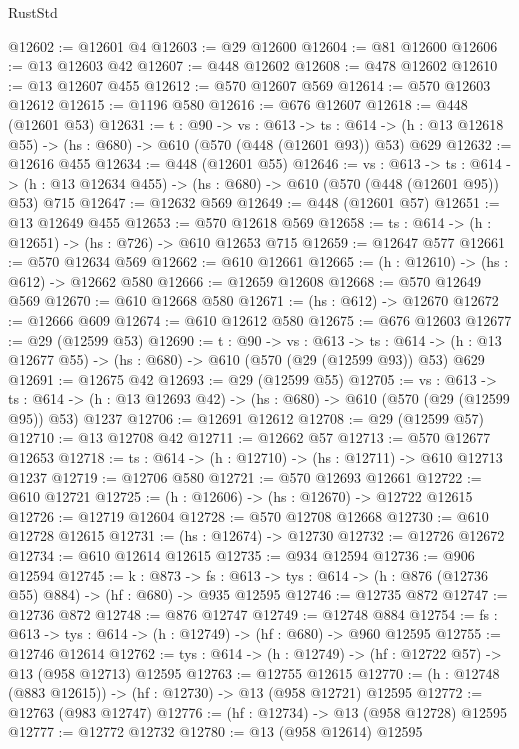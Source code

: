 \begin{lexlean}{RustStd}
\begin{coremodule}
@12602 := @12601 @4
@12603 := @29 @12600
@12604 := @81 @12600
@12606 := @13 @12603 @42
@12607 := @448 @12602
@12608 := @478 @12602
@12610 := @13 @12607 @455
@12612 := @570 @12607 @569
@12614 := @570 @12603 @12612
@12615 := @1196 @580
@12616 := @676 @12607
@12618 := @448 (@12601 @53)
@12631 := {t : @90} ->
  {vs : @613} ->
  {ts : @614} -> (h : @13 @12618 @55) -> (hs : @680) -> @610 (@570 (@448 (@12601 @93)) @53) @629
@12632 := @12616 @455
@12634 := @448 (@12601 @55)
@12646 := {vs : @613} ->
  {ts : @614} -> (h : @13 @12634 @455) -> (hs : @680) -> @610 (@570 (@448 (@12601 @95)) @53) @715
@12647 := @12632 @569
@12649 := @448 (@12601 @57)
@12651 := @13 @12649 @455
@12653 := @570 @12618 @569
@12658 := {ts : @614} -> (h : @12651) -> (hs : @726) -> @610 @12653 @715
@12659 := @12647 @577
@12661 := @570 @12634 @569
@12662 := @610 @12661
@12665 := (h : @12610) -> (hs : @612) -> @12662 @580
@12666 := @12659 @12608
@12668 := @570 @12649 @569
@12670 := @610 @12668 @580
@12671 := (hs : @612) -> @12670
@12672 := @12666 @609
@12674 := @610 @12612 @580
@12675 := @676 @12603
@12677 := @29 (@12599 @53)
@12690 := {t : @90} ->
  {vs : @613} ->
  {ts : @614} -> (h : @13 @12677 @55) -> (hs : @680) -> @610 (@570 (@29 (@12599 @93)) @53) @629
@12691 := @12675 @42
@12693 := @29 (@12599 @55)
@12705 := {vs : @613} ->
  {ts : @614} -> (h : @13 @12693 @42) -> (hs : @680) -> @610 (@570 (@29 (@12599 @95)) @53) @1237
@12706 := @12691 @12612
@12708 := @29 (@12599 @57)
@12710 := @13 @12708 @42
@12711 := @12662 @57
@12713 := @570 @12677 @12653
@12718 := {ts : @614} -> (h : @12710) -> (hs : @12711) -> @610 @12713 @1237
@12719 := @12706 @580
@12721 := @570 @12693 @12661
@12722 := @610 @12721
@12725 := (h : @12606) -> (hs : @12670) -> @12722 @12615
@12726 := @12719 @12604
@12728 := @570 @12708 @12668
@12730 := @610 @12728 @12615
@12731 := (hs : @12674) -> @12730
@12732 := @12726 @12672
@12734 := @610 @12614 @12615
@12735 := @934 @12594
@12736 := @906 @12594
@12745 := {k : @873} ->
  {fs : @613} -> {tys : @614} -> (h : @876 (@12736 @55) @884) -> (hf : @680) -> @935 @12595
@12746 := @12735 @872
@12747 := @12736 @872
@12748 := @876 @12747
@12749 := @12748 @884
@12754 := {fs : @613} -> {tys : @614} -> (h : @12749) -> (hf : @680) -> @960 @12595
@12755 := @12746 @12614
@12762 := {tys : @614} -> (h : @12749) -> (hf : @12722 @57) -> @13 (@958 @12713) @12595
@12763 := @12755 @12615
@12770 := (h : @12748 (@883 @12615)) -> (hf : @12730) -> @13 (@958 @12721) @12595
@12772 := @12763 (@983 @12747)
@12776 := (hf : @12734) -> @13 (@958 @12728) @12595
@12777 := @12772 @12732
@12780 := @13 (@958 @12614) @12595

\end{coremodule}
\end{lexlean}
